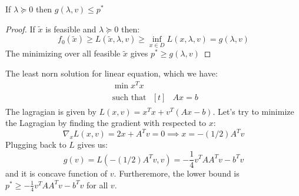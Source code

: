 \begin{proposition}
    If $\lambda\succeq0$ then $g(\lambda, v)\le p^*$
\end{proposition}
\begin{proof}
    If $\tilde{x}$ is feasible and $\lambda\succeq0$ then:
    \begin{equation*}
        f_0(\tilde{x}) \ge L(\tilde{x}, \lambda, v) \ge \inf_{x\in D} L(x,\lambda, v) = g(\lambda, v)
    \end{equation*}
    The minimizing over all feasible $\tilde{x}$ gives $p^*\ge g(\lambda, v)$
\end{proof}

\begin{remark}
    The least norn solution for linear equation, which we have:
    \begin{equation*}
    \begin{aligned}
        &\min x^Tx \\
        &\text{such that } \begin{aligned}[t]
            &Ax = b
        \end{aligned}
    \end{aligned}
    \end{equation*}
    The lagragian is given by $L(x, v) = x^Tx + v^T(Ax-b)$. Let's try to minimize the Lagragian by finding the gradient with respected to $x$:
    \begin{equation*}
        \nabla_x L(x, v) = 2x + A^Tv = 0 \implies x = -(1/2)A^Tv
    \end{equation*}
    Plugging back to $L$ gives us:
    \begin{equation*}
        g(v) = L( -(1/2)A^Tv, v) = -\frac{1}{4}v^TAA^Tv - b^Tv
    \end{equation*}
    and it is concave function of $v$. Furtheremore, the lower bound is $p^*\ge -\frac{1}{4}v^TAA^Tv - b^Tv$ for all $v$. 
\end{remark}

